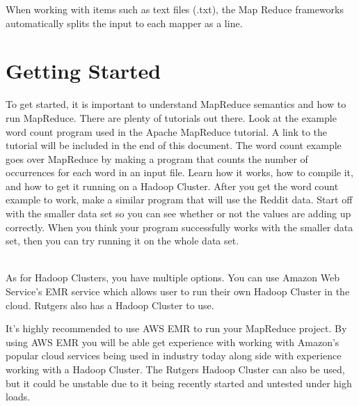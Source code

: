 \documentclass{article}
\begin{document}
\begin{info}
When working with items such as text files (.txt), the Map Reduce frameworks automatically splits the input to each mapper as a line. 
\end{info}


\section*{Getting Started}
To get started, it is important to understand MapReduce semantics and how to run MapReduce. There are plenty of tutorials out there. Look at the example word count program used in the Apache MapReduce tutorial. A link to the tutorial will be included in the end of this document. The word count example goes over MapReduce by making a program that counts the number of occurrences for each word in an input file. Learn how it works, how to compile it, and how to get it running on a Hadoop Cluster. After you get the word count example to work, make a similar program that will use the Reddit data. Start off with the smaller data set so you can see whether or not the values are adding up correctly. When you think your program successfully works with the smaller data set, then you can try running it on the whole data set. 

\-\ \\As for Hadoop Clusters, you have multiple options. You can use Amazon Web Service's EMR service which allows user to run their own Hadoop Cluster in the cloud. Rutgers also has a Hadoop Cluster to use.

\begin{info}
It's highly recommended to use AWS EMR to run your MapReduce project. By using AWS EMR you will be able get experience with working with Amazon's popular cloud services being used in industry today along side with experience working with a Hadoop Cluster. The Rutgers Hadoop Cluster can also be used, but it could be unstable due to it being recently started and untested under high loads.
\end{info}

\end{document}
